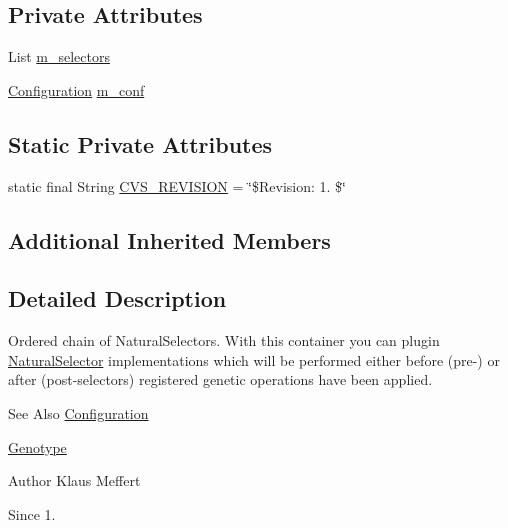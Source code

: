\subsection*{Private Attributes}
\begin{DoxyCompactItemize}
\item 
List \hyperlink{classorg_1_1jgap_1_1impl_1_1_chain_of_selectors_a246b1875379b6215222b201c838ddd1c}{m\-\_\-selectors}
\item 
\hyperlink{classorg_1_1jgap_1_1_configuration}{Configuration} \hyperlink{classorg_1_1jgap_1_1impl_1_1_chain_of_selectors_ae4fad23cc6cc7f47f8445baadab152c8}{m\-\_\-conf}
\end{DoxyCompactItemize}
\subsection*{Static Private Attributes}
\begin{DoxyCompactItemize}
\item 
static final String \hyperlink{classorg_1_1jgap_1_1impl_1_1_chain_of_selectors_a506aea491defe82826e504d504be910b}{C\-V\-S\-\_\-\-R\-E\-V\-I\-S\-I\-O\-N} = \char`\"{}\$Revision\-: 1. \$\char`\"{}
\end{DoxyCompactItemize}
\subsection*{Additional Inherited Members}


\subsection{Detailed Description}
Ordered chain of Natural\-Selectors. With this container you can plugin \hyperlink{classorg_1_1jgap_1_1_natural_selector}{Natural\-Selector} implementations which will be performed either before (pre-\/) or after (post-\/selectors) registered genetic operations have been applied.

\begin{DoxySeeAlso}{See Also}
\hyperlink{classorg_1_1jgap_1_1_configuration}{Configuration} 

\hyperlink{classorg_1_1jgap_1_1_genotype}{Genotype}
\end{DoxySeeAlso}
\begin{DoxyAuthor}{Author}
Klaus Meffert 
\end{DoxyAuthor}
\begin{DoxySince}{Since}
1. 
\end{DoxySince}


